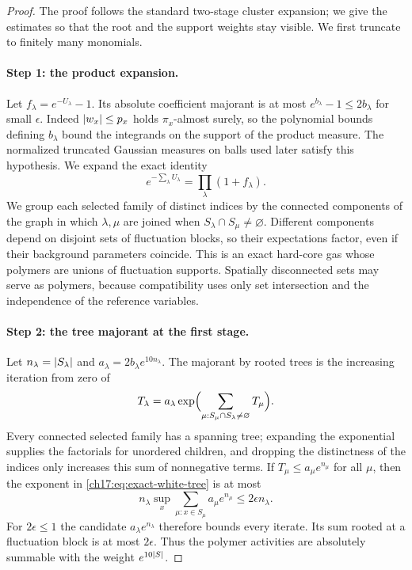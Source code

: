 \begin{proof}
The proof follows the standard two-stage cluster expansion; we give the estimates so that the root and the support weights stay visible. We first truncate to finitely many monomials.

\paragraph{Step 1: the product expansion.}
Let $f_\lambda=e^{-U_\lambda}-1$. Its absolute coefficient majorant is at most $e^{b_\lambda}-1\le2b_\lambda$ for small $\epsilon$. Indeed $\lvert w_x\rvert\le p_x$ holds $\pi_x$-almost surely, so the polynomial bounds defining $b_\lambda$ bound the integrands on the support of the product measure. The normalized truncated Gaussian measures on balls used later satisfy this hypothesis. We expand the exact identity
\[
 e^{-\sum_\lambda U_\lambda}=\prod_\lambda(1+f_\lambda).
\]
We group each selected family of distinct indices by the connected components of the graph in which $\lambda,\mu$ are joined when $S_\lambda\cap S_\mu\ne\varnothing$. Different components depend on disjoint sets of fluctuation blocks, so their expectations factor, even if their background parameters coincide. This is an exact hard-core gas whose polymers are unions of fluctuation supports. Spatially disconnected sets may serve as polymers, because compatibility uses only set intersection and the independence of the reference variables.

\paragraph{Step 2: the tree majorant at the first stage.}
Let $n_\lambda=\lvert S_\lambda\rvert$ and $a_\lambda=2b_\lambda e^{10n_\lambda}$. The majorant by rooted trees is the increasing iteration from zero of
\begin{equation}\label{ch17:eq:exact-white-tree}
 T_\lambda=a_\lambda\exp\Bigl(\sum_{\mu:S_\mu\cap S_\lambda\ne\varnothing}T_\mu\Bigr).
\end{equation}
Every connected selected family has a spanning tree; expanding the exponential supplies the factorials for unordered children, and dropping the distinctness of the indices only increases this sum of nonnegative terms. If $T_\mu\le a_\mu e^{n_\mu}$ for all $\mu$, then the exponent in \eqref{ch17:eq:exact-white-tree} is at most
\[
 n_\lambda\sup_x\sum_{\mu:x\in S_\mu}a_\mu e^{n_\mu}\le2\epsilon n_\lambda.
\]
For $2\epsilon\le1$ the candidate $a_\lambda e^{n_\lambda}$ therefore bounds every iterate. Its sum rooted at a fluctuation block is at most $2\epsilon$. Thus the polymer activities are absolutely summable with the weight $e^{10\lvert S\rvert}$.


\end{proof}
